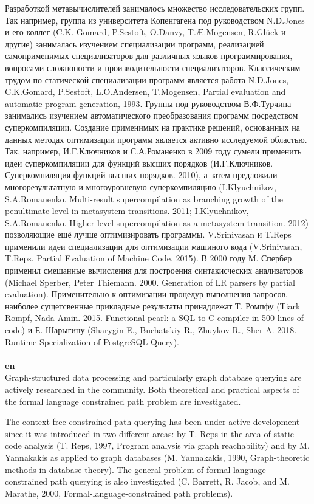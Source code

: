\documentclass[12pt]{article}  %
\theoremstyle{remark}
\begin{document}
Разработкой метавычислителей занималось множество исследовательских групп.
Так например, группа из университета Копенгагена под руководством N.D.Jones и его коллег (C.K. Gomard, P.Sestoft, O.Danvy, T.Æ.Mogensen, R.Glück и другие) занималась изучением специализации программ, реализацией самоприменимых специализаторов для различных языков программирования, вопросами сложноности и производительности специализаторов.
Классическим трудом по статической специализации программ является работа N.D.Jones, C.K.Gomard, P.Sestoft, L.O.Andersen, T.Mogensen,
Partial evaluation and automatic program generation, 1993.
Группы под руководством В.Ф.Турчина занимались изучением автоматического преобразования программ посредством суперкомпиляции.
Создание применимых на практике решений, основанных на данных методах оптимизации программ является активно исследуемой областью.
Так, например, И.Г.Ключников и С.А.Романенко в 2009 году сумели применить идеи суперкомпиляции для функций высших порядков (И.Г.Ключников. Суперкомпиляция функций высших порядков. 2010),
а затем предложили многорезультатную и многоуровневую суперкомпиляцию
(I.Klyuchnikov, S.A.Romanenko. Multi-result supercompilation as branching growth of the penultimate level in metasystem transitions. 2011; I.Klyuchnikov, S.A.Romanenko. Higher-level supercompilation as a metasystem transition. 2012) позволяющие ещё лучше оптимизировать программы.
V.Srinivasan и T.Reps применили идеи специализации для оптимизации машиного кода (V.Srinivasan, T.Reps. Partial Evaluation of Machine Code. 2015).
В 2000 году М. Спербер применил смешанные вычисления для построения синтакисческих анализаторов (Michael Sperber, Peter Thiemann. 2000. Generation of LR parsers by partial evaluation).
Применительно к оптимизации процедур выполнения запросов, наиболее сущетсвенные прикладные результаты принадлежат Т. Ромпфу (Tiark Rompf, Nada Amin. 2015. Functional pearl: a SQL to C compiler in 500 lines of code) и Е. Шарыгину (Sharygin E., Buchatskiy R., Zhuykov R., Sher A. 2018. Runtime Specialization of PostgreSQL Query).
\\
\\
\textbf{en}\\

Graph-structured data processing and particularly graph database querying are actively researched in the community. 
Both theoretical and practical aspects of the formal language constrained path problem are investigated.

The context-free constrained path querying has been under active development since it was introduced in two different areas: by T. Reps in the area of static code analysis (T. Reps, 1997, Program analysis via graph reachability) and by M. Yannakakis as applied to graph databases (M. Yannakakis, 1990, Graph-theoretic methods in database theory).
The general problem of formal language constrained path querying is also investigated (C. Barrett, R. Jacob, and M. Marathe, 2000, Formal-language-constrained path problems).
\end{document}

